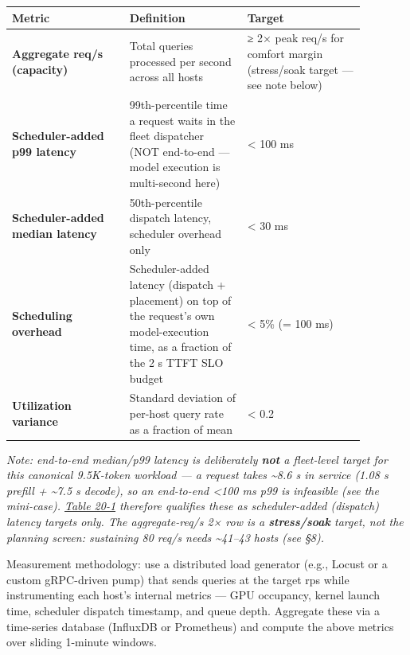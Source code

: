 \nopagebreak[4]
\begin{longtable}[]{@{}
  >{\raggedright\arraybackslash}p{0.2927\linewidth}
  >{\raggedright\arraybackslash}p{0.2927\linewidth}
  >{\raggedright\arraybackslash}p{0.2927\linewidth}@{}}
\toprule\noalign{}
\begin{minipage}[b]{\linewidth}\raggedright
Metric
\end{minipage} & \begin{minipage}[b]{\linewidth}\raggedright
Definition
\end{minipage} & \begin{minipage}[b]{\linewidth}\raggedright
Target
\end{minipage} \\
\midrule\noalign{}
\endhead
\bottomrule\noalign{}
\endlastfoot
\textbf{Aggregate req/s (capacity)} & Total queries processed per second
across all hosts & ≥ 2× peak req/s for comfort margin (stress/soak
target --- see note below) \\
\noalign{\label{tab:20.1}}
\textbf{Scheduler-added p99 latency} & 99th-percentile time a request
waits in the fleet dispatcher (NOT end-to-end --- model execution is
multi-second here) & \textless{} 100 ms \\
\textbf{Scheduler-added median latency} & 50th-percentile dispatch
latency, scheduler overhead only & \textless{} 30 ms \\
\textbf{Scheduling overhead} & Scheduler-added latency (dispatch +
placement) on top of the request's own model-execution time, as a
fraction of the 2 s TTFT SLO budget & \textless{} 5\% (= 100 ms) \\
\textbf{Utilization variance} & Standard deviation of per-host query
rate as a fraction of mean & \textless{} 0.2 \\
\end{longtable}

\emph{Note: end-to-end median/p99 latency is deliberately \textbf{not} a
fleet-level target for this canonical 9.5K-token workload --- a request
takes \textasciitilde8.6 s in service (1.08 s prefill +
\textasciitilde7.5 s decode), so an \emph{end-to-end} \textless100 ms
p99 is infeasible (see the mini-case). \hyperref[tab:20.1]{Table 20-1} therefore qualifies
these as scheduler-added (dispatch) latency targets only. The
aggregate-req/s 2× row is a \textbf{stress/soak} target, not the
planning screen: sustaining 80 req/s needs \textasciitilde41--43 hosts
(see §8).}

Measurement methodology: use a distributed load generator (e.g., Locust
or a custom gRPC-driven pump) that sends queries at the target rps while
instrumenting each host's internal metrics --- GPU occupancy, kernel
launch time, scheduler dispatch timestamp, and queue depth. Aggregate
these via a time-series database (InfluxDB or Prometheus) and compute
the above metrics over sliding 1-minute windows.

